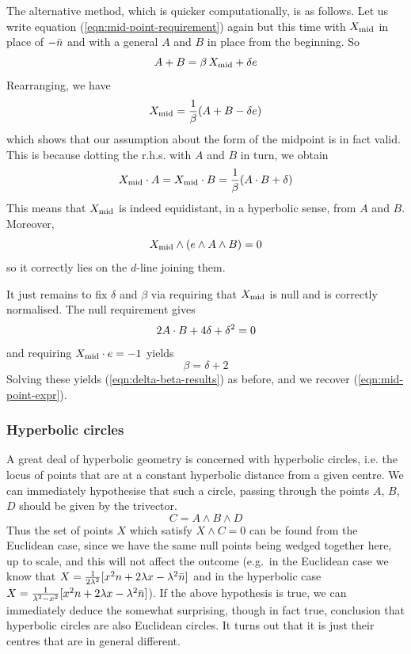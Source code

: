 The alternative method, which is quicker computationally, is as
follows. Let us write equation (\ref{eqn:mid-point-requirement})
again but this time with $X_{\rm mid}$ in place of $-\bar{n}$ and with
a general $A$ and $B$ in place from the beginning. So
%
\begin{equation}
A+B = \beta \, X_{\rm mid} + \delta e
\end{equation}
%
Rearranging, we have
%
\begin{equation}
X_{\rm mid} = \frac{1}{\beta} (A+B-\delta e)
\end{equation}
%
which shows that our assumption about the form of the
midpoint is in fact valid. This is because dotting the
r.h.s. with $A$ and $B$ in turn, we obtain
%
\begin{equation}
X_{\rm mid} \cdot A = X_{\rm mid} \cdot B = \frac{1}{\beta}
(A\cdot B+\delta)
\end{equation}
%
This means that $X_{\rm mid}$ is indeed equidistant, in a
hyperbolic sense, from $A$ and $B$. Moreover,
%
\begin{equation}
X_{\rm mid} \wedge (e \wedge A \wedge B) = 0
\end{equation}
%
so it correctly lies on the $d$-line joining them.

It just remains to fix $\delta$ and $\beta$ via requiring
that $X_{\rm mid}$ is null and is correctly normalised.
The null requirement gives
%
\begin{equation}
2 A \cdot B + 4 \delta + \delta^2 = 0
\end{equation}
%
and requiring $X_{\rm mid} \cdot e = -1$ yields
%
\begin{equation}
\beta=\delta+2
\end{equation}
%
Solving these yields (\ref{eqn:delta-beta-results}) as
before, and we recover (\ref{eqn:mid-point-expr}).

\subsubsection{Hyperbolic circles}

A great deal of hyperbolic geometry is concerned with
hyperbolic circles, i.e. the locus of points that are
at a constant hyperbolic distance from a given centre.
We can immediately hypothesise that such a circle,
passing through the points $A$, $B$, $D$  should be given
by the trivector.
%
\begin{equation}
C = A \wedge B \wedge D
\end{equation}
%
Thus the set of points $X$ which satisfy $X\wedge C=0$ can be found
from the Euclidean case, since we have the same null points being
wedged together here, up to scale, and this will not affect the
outcome (e.g.\ in the Euclidean case we know that $X =
\frac{1}{2\lambda^2}[x^2n + 2\lambda x - \lambda^2\bar{n}]$ and in the
hyperbolic case $X = \frac{1}{\lambda^2 - x^2}[x^2n + 2\lambda
x - \lambda^2\bar{n}]$). If the above hypothesis is true, we can
immediately deduce the somewhat surprising, though in fact true,
conclusion that hyperbolic circles are also Euclidean circles.
It turns out that it is just their centres that are in general
different.

